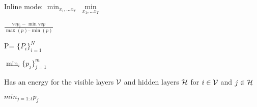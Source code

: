 \documentclass{article}
\begin{document}
Inline mode:
$\displaystyle \min_{x_1,\dots x_T}$
$\min\limits_{x_1,\dots x_T}$

\bigskip


$\frac{\mathrm{ve} p_i - \min \mathrm{ve} p}{\max(p) – \min (p)}$

P= $\{ P_i \}_{i=1}^N$ 

$ \min_i \{ p_j \}_{j=1}^m$

Has an energy for the visible layers ${\cal V}$ and hidden layers ${\cal H}$ for $i \in {\cal V}$ and $ j \in {\cal H}$

$min_{j=1:t} p_j$
\end{document}
